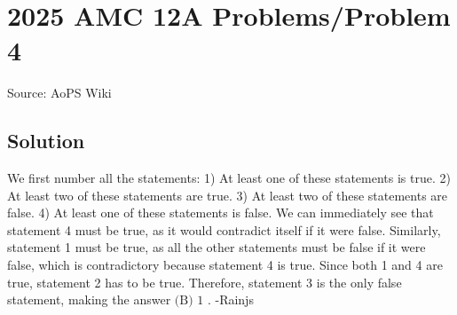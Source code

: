 \documentclass[12pt]{article}
\begin{document}
\section*{{2025 AMC 12A Problems/Problem 4}}
Source: AoPS Wiki

\subsection*{Solution}
We first number all the statements: 1) At least one of these statements is true.
2) At least two of these statements are true.
3) At least two of these statements are false.
4) At least one of these statements is false. We can immediately see that statement 4 must be true, as it would contradict itself if it were false. Similarly, statement 1 must be true, as all the other statements must be false if it were false, which is contradictory because statement 4 is true. Since both 1 and 4 are true, statement 2 has to be true. Therefore, statement 3 is the only false statement, making the answer $\boxed{\text{(B) }1}$ .
-Rainjs
\end{document}
